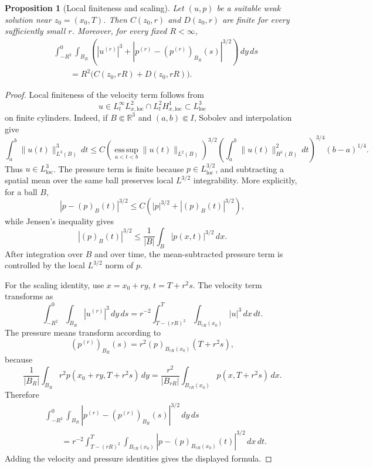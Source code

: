 \documentclass[11pt]{amsart}
\theoremstyle{plain}
\newtheorem{proposition}[proposition]{Proposition}
\theoremstyle{definition}
\theoremstyle{remark}
\numberwithin{equation}{section}
\begin{document}
\begin{proposition}[Local finiteness and scaling]\label{p0:prop:critical-scaling}
Let \((u,p)\) be a suitable weak solution near \(z_0=(x_0,T)\).  Then
\(C(z_0,r)\) and \(D(z_0,r)\) are finite for every sufficiently small \(r\).
Moreover, for every fixed \(R<\infty\),
\[
\begin{aligned}
&\int_{-R^2}^{0}\int_{B_R}
\left(
|u^{(r)}|^3+
|p^{(r)}-(p^{(r)})_{B_R}(s)|^{3/2}
\right)\,dy\,ds \\
&\qquad
=R^2\bigl(C(z_0,rR)+D(z_0,rR)\bigr).
\end{aligned}
\]
\end{proposition}

\begin{proof}
Local finiteness of the velocity term follows from
\[
  u\in L^\infty_tL^2_{x,\mathrm{loc}}
  \cap L^2_tH^1_{x,\mathrm{loc}}
  \subset L^3_{\mathrm{loc}}
\]
on finite cylinders.  Indeed, if \(B\Subset\mathbb R^3\) and
\((a,b)\Subset I\), Sobolev and interpolation give
\[
  \int_a^b \|u(t)\|_{L^3(B)}^3\,dt
  \le
  C
  \left(\operatorname*{ess\,sup}_{a<t<b}\|u(t)\|_{L^2(B)}\right)^{3/2}
  \left(\int_a^b \|u(t)\|_{H^1(B)}^2\,dt\right)^{3/4}
  (b-a)^{1/4}.
\]
Thus \(u\in L^3_{\mathrm{loc}}\).  The pressure term is finite because
\(p\in L^{3/2}_{\mathrm{loc}}\), and subtracting a spatial mean over the same
ball preserves local \(L^{3/2}\) integrability.  More explicitly, for a ball
\(B\),
\[
  |p-(p)_B(t)|^{3/2}\le C\left(|p|^{3/2}+|(p)_B(t)|^{3/2}\right),
\]
while Jensen's inequality gives
\[
  |(p)_B(t)|^{3/2}
  \le \frac1{|B|}\int_B |p(x,t)|^{3/2}\,dx.
\]
After integration over \(B\) and over time, the mean-subtracted pressure term is
controlled by the local \(L^{3/2}\) norm of \(p\).

For the scaling identity, use \(x=x_0+ry\), \(t=T+r^2s\).  The velocity term
transforms as
\[
  \int_{-R^2}^{0}\int_{B_R}|u^{(r)}|^3\,dy\,ds
  =r^{-2}\int_{T-(rR)^2}^{T}\int_{B_{rR}(x_0)}|u|^3\,dx\,dt.
\]
The pressure means transform according to
\[
  (p^{(r)})_{B_R}(s)=r^2(p)_{B_{rR}(x_0)}(T+r^2s),
\]
because
\[
  \frac1{|B_R|}\int_{B_R} r^2p(x_0+ry,T+r^2s)\,dy
  =
  \frac{r^2}{|B_{rR}|}\int_{B_{rR}(x_0)}p(x,T+r^2s)\,dx .
\]
Therefore
\[
\begin{aligned}
&\int_{-R^2}^{0}\int_{B_R}
|p^{(r)}-(p^{(r)})_{B_R}(s)|^{3/2}\,dy\,ds \\
&\qquad =
r^{-2}\int_{T-(rR)^2}^{T}\int_{B_{rR}(x_0)}
|p-(p)_{B_{rR}(x_0)}(t)|^{3/2}\,dx\,dt .
\end{aligned}
\]
Adding the velocity and pressure identities gives the displayed formula.
\end{proof}
\end{document}
